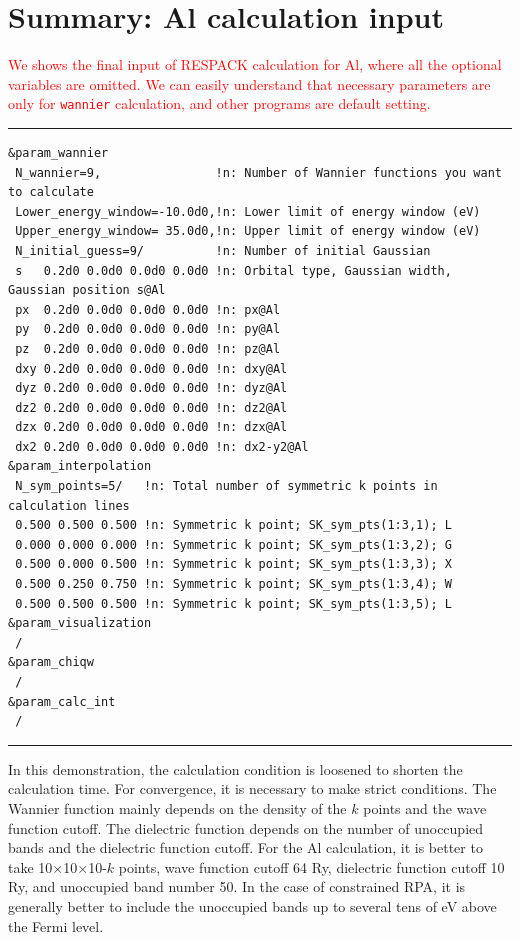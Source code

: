 \documentclass{article}
\newcommand{\tr}[1]{\textcolor{red}{#1}}
\begin{document}
\section{\label{Al-summary}Summary: Al calculation input} 
\tr{We shows the final input of RESPACK calculation for Al, where all the optional variables are omitted. We can easily understand that necessary parameters are only for {\tt wannier} calculation, and other programs are default setting.} 
\vspace{3mm}\hrule
\begin{verbatim}
&param_wannier 
 N_wannier=9,                !n: Number of Wannier functions you want to calculate
 Lower_energy_window=-10.0d0,!n: Lower limit of energy window (eV)
 Upper_energy_window= 35.0d0,!n: Upper limit of energy window (eV)
 N_initial_guess=9/          !n: Number of initial Gaussian
 s   0.2d0 0.0d0 0.0d0 0.0d0 !n: Orbital type, Gaussian width, Gaussian position s@Al
 px  0.2d0 0.0d0 0.0d0 0.0d0 !n: px@Al
 py  0.2d0 0.0d0 0.0d0 0.0d0 !n: py@Al
 pz  0.2d0 0.0d0 0.0d0 0.0d0 !n: pz@Al
 dxy 0.2d0 0.0d0 0.0d0 0.0d0 !n: dxy@Al
 dyz 0.2d0 0.0d0 0.0d0 0.0d0 !n: dyz@Al
 dz2 0.2d0 0.0d0 0.0d0 0.0d0 !n: dz2@Al
 dzx 0.2d0 0.0d0 0.0d0 0.0d0 !n: dzx@Al
 dx2 0.2d0 0.0d0 0.0d0 0.0d0 !n: dx2-y2@Al
&param_interpolation   
 N_sym_points=5/   !n: Total number of symmetric k points in calculation lines
 0.500 0.500 0.500 !n: Symmetric k point; SK_sym_pts(1:3,1); L
 0.000 0.000 0.000 !n: Symmetric k point; SK_sym_pts(1:3,2); G
 0.500 0.000 0.500 !n: Symmetric k point; SK_sym_pts(1:3,3); X
 0.500 0.250 0.750 !n: Symmetric k point; SK_sym_pts(1:3,4); W
 0.500 0.500 0.500 !n: Symmetric k point; SK_sym_pts(1:3,5); L 
&param_visualization
 /  
&param_chiqw 
 /
&param_calc_int 
 /
\end{verbatim}
\hrule\vspace{3mm}

In this demonstration, the calculation condition is loosened to shorten the calculation time. For convergence, it is necessary to make strict conditions. The Wannier function mainly depends on the density of the $k$ points and the wave function cutoff. The dielectric function depends on the number of unoccupied bands and the dielectric function cutoff. For the Al calculation, it is better to take 10$\times$10$\times$10-$k$ points, wave function cutoff 64 Ry, dielectric function cutoff 10 Ry, and unoccupied band number 50. In the case of constrained RPA, it is generally better to include the unoccupied bands up to several tens of eV above the Fermi level.
\end{document}
